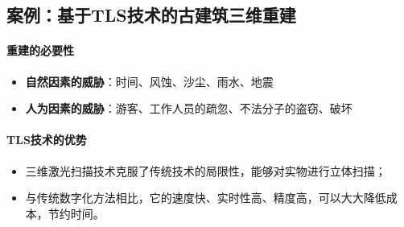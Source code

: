 \subsection{案例：基于TLS技术的古建筑三维重建}

\paragraph{重建的必要性}
\begin{itemize}
	\item \textbf{自然因素的威胁}：时间、风蚀、沙尘、雨水、地震
	\item \textbf{人为因素的威胁}：游客、工作人员的疏忽、不法分子的盗窃、破坏
\end{itemize}

\paragraph{TLS技术的优势}
\begin{itemize}
	\item 三维激光扫描技术克服了传统技术的局限性，能够对实物进行立体扫描；
	\item 与传统数字化方法相比，它的速度快、实时性高、精度高，可以大大降低成本，节约时间。
\end{itemize}

